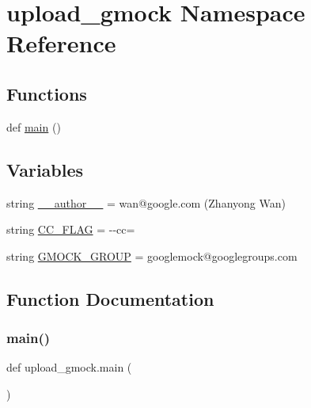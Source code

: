 \hypertarget{namespaceupload__gmock}{}\section{upload\+\_\+gmock Namespace Reference}
\label{namespaceupload__gmock}
\subsection*{Functions}
\begin{DoxyCompactItemize}
\item 
def \mbox{\hyperlink{namespaceupload__gmock_aea9cb062f9294622c32e54eb937f588e}{main}} ()
\end{DoxyCompactItemize}
\subsection*{Variables}
\begin{DoxyCompactItemize}
\item 
string \mbox{\hyperlink{namespaceupload__gmock_a56f523bfe887b27722a3ea662b4d88d7}{\+\_\+\+\_\+author\+\_\+\+\_\+}} = \textquotesingle{}wan@google.\+com (Zhanyong Wan)\textquotesingle{}
\item 
string \mbox{\hyperlink{namespaceupload__gmock_a463de67b37725c16ba31c5d4702e15b8}{C\+C\+\_\+\+F\+L\+AG}} = \textquotesingle{}-\/-\/cc=\textquotesingle{}
\item 
string \mbox{\hyperlink{namespaceupload__gmock_acf8fe60647d8c3748b0e22dcf669efee}{G\+M\+O\+C\+K\+\_\+\+G\+R\+O\+UP}} = \textquotesingle{}googlemock@googlegroups.\+com\textquotesingle{}
\end{DoxyCompactItemize}


\subsection{Function Documentation}
\mbox{\label{namespaceupload__gmock_aea9cb062f9294622c32e54eb937f588e}} 
\subsubsection{\texorpdfstring{main()}{main()}}
{\footnotesize\ttfamily def upload\+\_\+gmock.\+main (\begin{DoxyParamCaption}{ }\end{DoxyParamCaption})}



